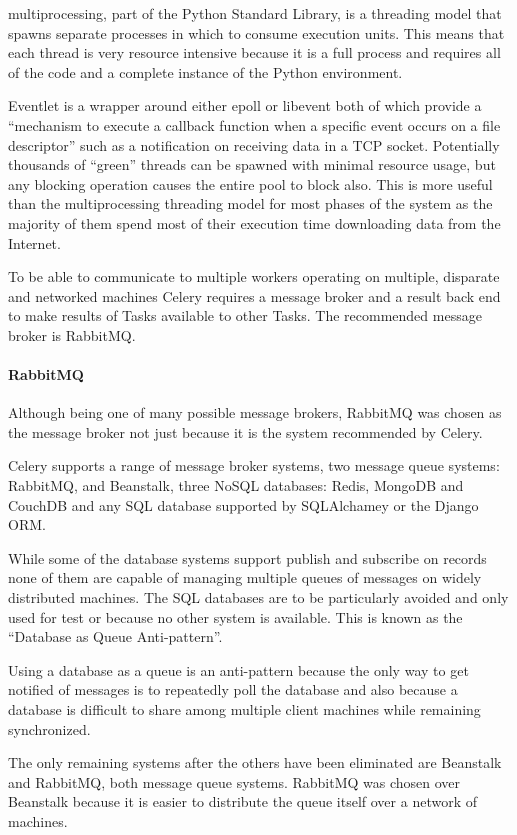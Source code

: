 multiprocessing, part of the Python Standard Library, is a threading model that spawns separate processes in which to consume execution units.  This means that each thread is very resource intensive because it is a full process and requires all of the code and a complete instance of the Python environment.

Eventlet is a wrapper around either epoll or libevent both of which provide a ``mechanism to execute a callback function when a specific event occurs on a file descriptor'' such as a notification on receiving data in a TCP socket.  Potentially thousands of ``green'' threads can be spawned with minimal resource usage, but any blocking operation causes the entire pool to block also. This is more useful than the multiprocessing threading model for most phases of the system as the majority of them spend most of their execution time downloading data from the Internet.

To be able to communicate to multiple workers operating on multiple, disparate and networked machines Celery requires a message broker and a result back end to make results of Tasks available to other Tasks.  The recommended message broker is RabbitMQ.

\paragraph{RabbitMQ}
Although being one of many possible message brokers, RabbitMQ was chosen as the message broker not just because it is the system recommended by Celery.

Celery supports a range of message broker systems, two message queue systems: RabbitMQ, and Beanstalk, three NoSQL databases: Redis, MongoDB and CouchDB and any SQL database supported by SQLAlchamey or the Django ORM.

While some of the database systems support publish and subscribe on records none of them are capable of managing multiple queues of messages on widely distributed machines.  The SQL databases are to be particularly avoided and only used for test or because no other system is available. This is known as the ``Database as Queue Anti-pattern''\cite{database-as-mq}.

Using a database as a queue is an anti-pattern because the only way to get notified of messages is to repeatedly poll the database and also because a database is difficult to share among multiple client machines while remaining synchronized.

The only remaining systems after the others have been eliminated are Beanstalk and RabbitMQ, both message queue systems. RabbitMQ was chosen over Beanstalk because it is easier to distribute the queue itself over a network of machines.

